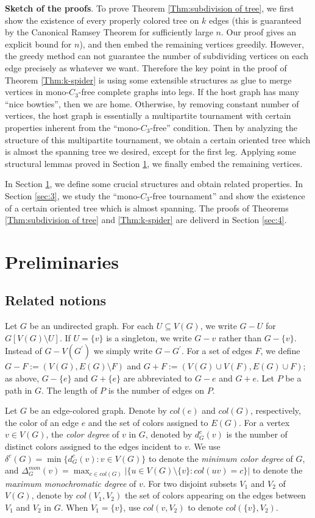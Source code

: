 \documentclass[10pt,a4paper]{article}
\theoremstyle{definition}
\begin{document}
\noindent \textbf{Sketch of the proofs}. To prove Theorem \ref{Thm:subdivision of tree}, we first show the existence of every properly colored tree on $k$ edges (this is guaranteed by the Canonical Ramsey Theorem for sufficiently large $n$. Our proof gives an explicit bound for $n$), and then embed the remaining vertices greedily. However, the greedy method can not guarantee the number of subdividing vertices on each edge precisely as whatever we want. Therefore the key point in the proof of Theorem \ref{Thm:k-spider} is using some extensible structures as glue to merge vertices in mono-$C_3$-free complete graphs into legs. If the host graph has many ``nice bowties'', then we are home. Otherwise, by removing constant number of vertices, the host graph is essentially a multipartite tournament with certain properties inherent from the ``mono-$C_3$-free'' condition. Then by analyzing the structure of this multipartite tournament, we obtain a certain oriented tree which is almost the spanning tree we desired, except for the first leg. Applying some structural lemmas proved in  Section \ref{sec:2}, we finally embed the remaining vertices.

In Section \ref{sec:2}, we define some crucial structures and obtain related properties. In Section \ref{sec:3}, we study the ``mono-$C_3$-free tournament'' and show the existence of a certain oriented tree which is almost spanning. The proofs of Theorems \ref{Thm:subdivision of tree} and \ref{Thm:k-spider} are deliverd in Section \ref{sec:4}.
\section{Preliminaries}\label{sec:2}
\subsection{Related notions}

Let $G$ be an undirected graph. For each $U\subseteq V(G)$, we write $G-U$ for
$G[V(G) \setminus U]$.  If  $U=\{v\}$ is a singleton,
we write $G- v$ rather than $G-\{v\}$. Instead of $G-V (G^{\prime}  )$ we simply
write $G-G^{\prime}$.  For a set of edges $F$, we define $G-F:= (V(G), E(G)\setminus F)$ and $G+F:= (V(G)\cup V(F), E(G) \cup F)$;
as above, $G-\{e\}$ and $G+\{e\}$ are abbreviated to
$ G-e$ and $G+e$. Let $P$ be a path in $G$. The length of $P$ is the number of edges on $P$.


Let $G$ be an edge-colored graph. Denote by $col(e)$ and $col(G)$, respectively, the color of an edge $e$ and the set of colors assigned to $E(G)$.
For a vertex $v\in V(G)$, the \textit{color degree} of $v$ in $G$, denoted by $d^{c}_{G}(v)$ is the number of distinct colors assigned to the edges incident to $v$.
We use $\delta^{c}(G)=\min\{d^{c}_{G}(v): v\in V(G)\}$ to denote the \emph{minimum color degree} of $G$, and $\Delta^{mon}_G(v) = \max_{c\in col(G)}|\{u\in V(G)\setminus\{v\}: col(uv) = c\}|$ to denote the \emph{maximum monochromatic degree} of $v$.
For two disjoint subsets $V_1$ and $V_2$ of $V(G)$, denote by $col(V_1, V_2)$ the set of colors appearing on the edges between $V_1$ and $V_2$ in $G$. When $V_1=\{v\}$, use $col(v, V_2)$ to denote $col(\{v\}, V_2)$.
\end{document}
